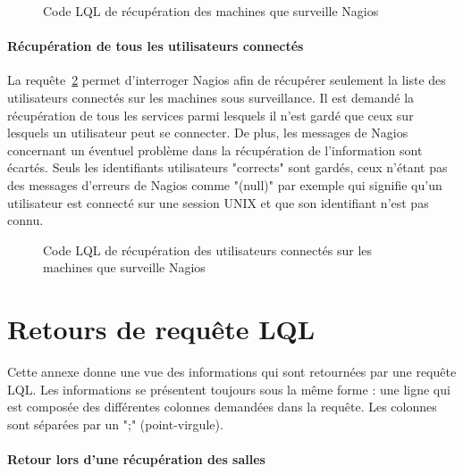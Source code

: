 \begin{appendices}
\begin{figure}[!ht]
	
	\caption{Code LQL de r\'ecup\'eration des machines que surveille Nagios}
	\label{annexe:nagiosGetResources}

\end{figure}

\subsubsection{R\'ecup\'eration de tous les utilisateurs connect\'es}

La requ\^ete~\ref{annexe:nagiosGetUsersLogged} permet d'interroger Nagios afin de r\'ecup\'erer seulement la liste des utilisateurs connect\'es sur les machines sous surveillance.
Il est demand\'e la r\'ecup\'eration de tous les services parmi lesquels il n'est gard\'e que ceux sur lesquels un utilisateur peut se connecter.
De plus, les messages de Nagios concernant un \'eventuel probl\`eme dans la r\'ecup\'eration de l'information sont \'ecart\'es.
Seuls les identifiants utilisateurs "corrects" sont gard\'es, {\cad} ceux n'\'etant pas des messages d'erreurs de Nagios comme "(null)" par exemple qui signifie qu'un utilisateur est connect\'e sur une session UNIX et que son identifiant n'est pas connu.

\vspace{0.20cm}

\begin{figure}[!ht]
	
	\caption{Code LQL de r\'ecup\'eration des utilisateurs connect\'es sur les machines que surveille Nagios}
	\label{annexe:nagiosGetUsersLogged}

\end{figure}

\chapter{Retours de requ\^ete LQL}
\label{chapterAnnexe:reponseLQLNagios}

Cette annexe donne une vue des informations qui sont retourn\'ees par une requ\^ete LQL.
Les informations se pr\'esentent toujours sous la m\^eme forme : une ligne qui est compos\'ee des diff\'erentes colonnes demand\'ees dans la requ\^ete.
Les colonnes sont s\'epar\'ees par un \textsf{";" (point-virgule)}.

\subsubsection{Retour lors d'une r\'ecup\'eration des salles}


\end{appendices}
